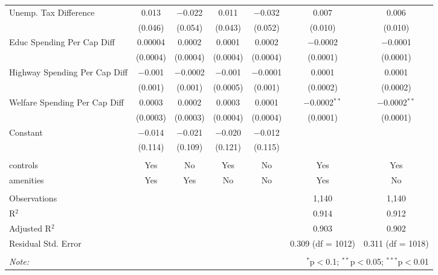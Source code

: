 \begin{table}[!htbp]
\begin{tabular}{@{\extracolsep{5pt}}lcccccc}
  Unemp. Tax Difference & 0.013 & $-$0.022 & 0.011 & $-$0.032 & 0.007 & 0.006 \\ 
  & (0.046) & (0.054) & (0.043) & (0.052) & (0.010) & (0.010) \\ 
  Educ Spending Per Cap Diff & 0.00004 & 0.0002 & 0.0001 & 0.0002 & $-$0.0002 & $-$0.0001 \\ 
  & (0.0004) & (0.0004) & (0.0004) & (0.0004) & (0.0001) & (0.0001) \\ 
  Highway Spending Per Cap Diff & $-$0.001 & $-$0.0002 & $-$0.001 & $-$0.0001 & 0.0001 & 0.0001 \\ 
  & (0.001) & (0.001) & (0.0005) & (0.001) & (0.0002) & (0.0002) \\ 
  Welfare Spending Per Cap Diff & 0.0003 & 0.0002 & 0.0003 & 0.0001 & $-$0.0002$^{**}$ & $-$0.0002$^{**}$ \\ 
  & (0.0003) & (0.0003) & (0.0004) & (0.0004) & (0.0001) & (0.0001) \\ 
  Constant & $-$0.014 & $-$0.021 & $-$0.020 & $-$0.012 &  &  \\ 
  & (0.114) & (0.109) & (0.121) & (0.115) &  &  \\ 
 \hline \\[-1.8ex] 
controls & Yes & No & Yes & No & Yes & Yes \\ 
amenities & Yes & Yes & No & No & Yes & No \\ 
\hline \\[-1.8ex] 
Observations &  &  &  &  & 1,140 & 1,140 \\ 
R$^{2}$ &  &  &  &  & 0.914 & 0.912 \\ 
Adjusted R$^{2}$ &  &  &  &  & 0.903 & 0.902 \\ 
Residual Std. Error &  &  &  &  & 0.309 (df = 1012) & 0.311 (df = 1018) \\ 
\hline 
\hline \\[-1.8ex] 
\textit{Note:}  & \multicolumn{6}{r}{$^{*}$p$<$0.1; $^{**}$p$<$0.05; $^{***}$p$<$0.01} \\ 
\end{tabular} 
\end{table} 
